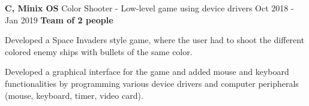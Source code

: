 \cventry
  {\textbf{C, Minix OS}}
  {Color Shooter - Low-level game using device drivers \href{https://github.com/EduRibeiro00/ColorShooter-feup-lcom}{\faExternalLink}} %
  {Oct 2018 - Jan 2019}
  {\textbf{Team of 2 people}}
  {
    \begin{cvitems} %
      \item {Developed a Space Invaders style game, where the user had to shoot the different colored enemy ships with bullets of the same color.}
      \item {Developed a graphical interface for the game and added mouse and keyboard functionalities by programming various device drivers and computer peripherals (mouse, keyboard, timer, video card).}
    \end{cvitems}
  }